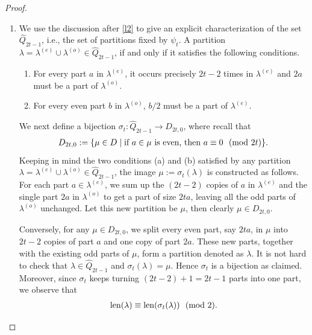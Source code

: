 \documentclass[12pt,reqno]{amsart}
\numberwithin{equation}{section}
\newcommand{\len}{\mathrm{len}}
\newcommand{\tpmod}[1]{\mkern 12mu(\textup{mod}\mkern 6mu #1)}
\begin{document}
\begin{proof}
\begin{enumerate}
	\item[\textbf{Step 2:}] We use the discussion after \eqref{l2} to give an explicit characterization of the set $\hat{Q}_{2t-1}$, i.e., the set of partitions fixed by $\psi_{t}$. A partition $\lambda=\lambda^{(e)}\cup\lambda^{(o)}\in \hat{Q}_{2t-1}$, if and only if it satisfies the following conditions.
	\begin{enumerate}
		\item For every part $a$ in $\lambda^{(e)}$, it occurs precisely $2t-2$ times in $\lambda^{(e)}$ and $2a$ must be a part of $\lambda^{(o)}$.
		\item For every even part $b$ in $\lambda^{(o)}$, $b/2$ must be a part of $\lambda^{(e)}$.
	\end{enumerate}
	We next define a bijection $\sigma_{t}:\hat{Q}_{2t-1}\to D_{2t,0}$, where recall that
		\begin{align*}
			D_{2t,0}:=
			\{\mu\in D \mid \text{if $a\in \mu$ is even, then $a \equiv 0\tpmod{2t}$}\}.
		\end{align*}
	Keeping in mind the two conditions (a) and (b) satisfied by any partition $\lambda=\lambda^{(e)}\cup\lambda^{(o)}\in\hat{Q}_{2t-1}$, the image $\mu:=\sigma_t(\lambda)$ is constructed as follows. For each part $a\in\lambda^{(e)}$, we sum up the $(2t-2)$ copies of $a$ in $\lambda^{(e)}$ and the single part $2a$ in $\lambda^{(o)}$ to get a part of size $2ta$, leaving all the odd parts of $\lambda^{(o)}$ unchanged. Let this new partition be $\mu$, then clearly $\mu\in D_{2t,0}$.
	
  Conversely, for any $\mu\in D_{2t,0}$, we split every even part, say $2ta$, in $\mu$ into $2t-2$ copies of part $a$ and one copy of part $2a$. These new parts, together with the existing odd parts of $\mu$, form a partition denoted as $\lambda$. It is not hard to check that $\lambda\in\hat{Q}_{2t-1}$ and $\sigma_t(\lambda)=\mu$. Hence $\sigma_{t}$ is a bijection as claimed. Moreover, since $\sigma_t$ keeps turning $(2t-2)+1=2t-1$ parts into one part, we observe that
  \begin{align}\label{sigma-len}
  \len(\lambda)\equiv \len(\sigma_t(\lambda))\tpmod 2.
  \end{align}
		

\end{enumerate}
\end{proof}
\end{document}

